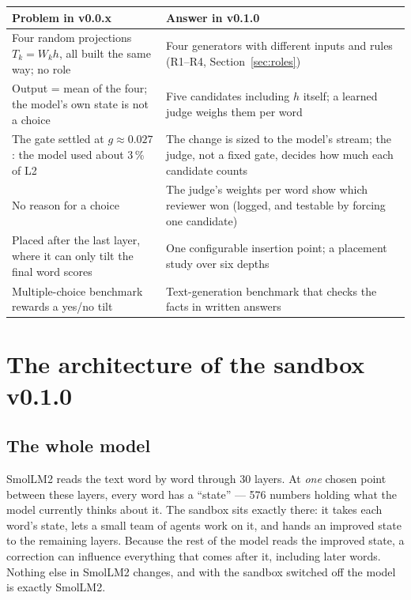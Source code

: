 \documentclass[a4paper,12pt,parskip=half,headsepline]{scrartcl}
\begin{document}
\begin{center}
\begin{tabularx}{\linewidth}{@{}YY@{}}
\toprule
\textbf{Problem in v0.0.x} & \textbf{Answer in v0.1.0}\\
\midrule
Four random projections $T_k = W_k h$, all built the same way; no role & Four generators with different inputs and rules (R1--R4, Section~\ref{sec:roles})\\
Output = mean of the four; the model's own state is not a choice & Five candidates including $h$ itself; a learned judge weighs them per word\\
The gate settled at $g \approx 0.027$: the model used about 3\,\% of L2 & The change is sized to the model's stream; the judge, not a fixed gate, decides how much each candidate counts\\
No reason for a choice & The judge's weights per word show which reviewer won (logged, and testable by forcing one candidate)\\
Placed after the last layer, where it can only tilt the final word scores & One configurable insertion point; a placement study over six depths\\
Multiple-choice benchmark rewards a yes/no tilt & Text-generation benchmark that checks the facts in written answers\\
\bottomrule
\end{tabularx}
\end{center}

\section{The architecture of the sandbox v0.1.0}

\subsection{The whole model}

\begin{plain}
SmolLM2 reads the text word by word through 30 layers. At \emph{one} chosen point
between these layers, every word has a ``state'' --- 576 numbers holding what the
model currently thinks about it. The sandbox sits exactly there: it takes each
word's state, lets a small team of agents work on it, and hands an improved state
to the remaining layers. Because the rest of the model reads the improved state,
a correction can influence everything that comes after it, including later words.
Nothing else in SmolLM2 changes, and with the sandbox switched off the model is
exactly SmolLM2.
\end{plain}
\end{document}
